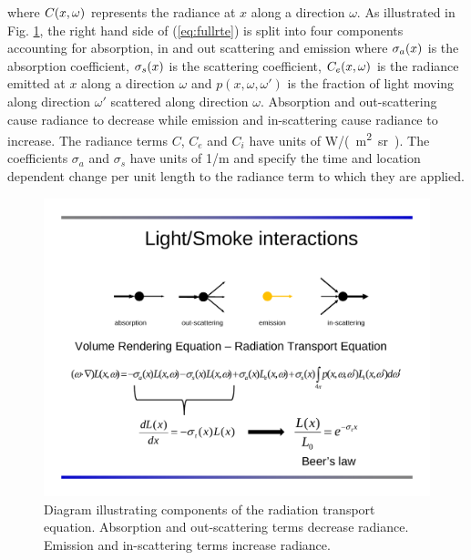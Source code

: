 \noindent where  $C(x,\omega)$ represents the  radiance at $x$ along a
direction $\omega$. As illustrated in Fig. \ref{figRadiance}, the
right hand side of (\ref{eq:fullrte}) is split into four
components accounting for absorption, in and out scattering and
emission where $\sigma_a(x)$ is the absorption coefficient, $\sigma_s(x)$ is
the scattering coefficient, $C_e(x,\omega)$ is the radiance emitted at $x$
along a direction $\omega$ and $p(x,\omega,\omega')$ is the
fraction of light moving along direction $\omega'$ scattered along
direction $\omega$. Absorption and out-scattering cause radiance
to decrease while emission and in-scattering cause radiance to
increase. The radiance terms $C$, $C_e$ and $C_i$ have units of
\si{W/(m^2.sr)}. The coefficients $\sigma_a$ and $\sigma_s$ have
units of \si{1/m} and specify the time and location dependent
change per unit length to the radiance term to which they are
applied.

\begin{figure}[\figoptions]
\begin{center}
\includegraphics[width=6.0in]{FIGURES/rte_setup}
\end{center}
\caption[Diagram illustrating components of the radiation
transport equation]{Diagram illustrating components of the
radiation transport equation.  Absorption and out-scattering terms
decrease radiance.  Emission and in-scattering terms increase
radiance.} \label{figRadiance}
\end{figure}


